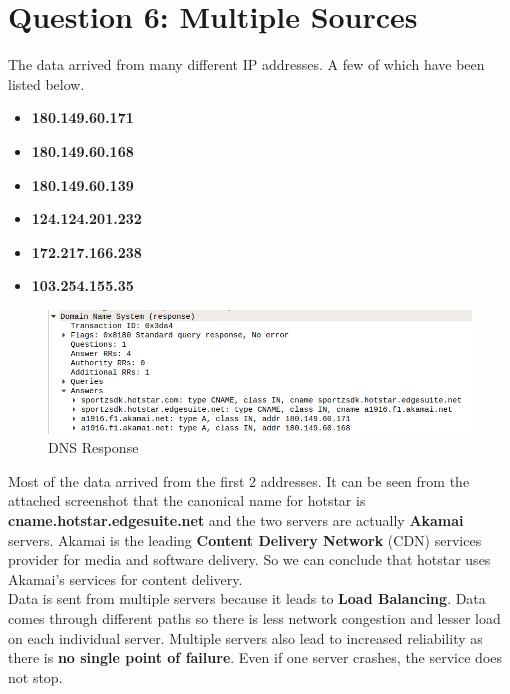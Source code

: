 \documentclass[a4paper,10pt]{article}
\newlength{\strutheight}
\begin{document}
\section*{Question 6: Multiple Sources}
The data arrived from many different IP addresses. A few of which have been listed below.
\begin{itemize}[{\color{Magenta}$\star$}]
	\item \textbf{180.149.60.171}
	\item \textbf{180.149.60.168}
	\item \textbf{180.149.60.139}
	\item \textbf{124.124.201.232}
	\item \textbf{172.217.166.238}
	\item \textbf{103.254.155.35}
\end{itemize}
\begin{adjustbox}{valign=T,raise=\strutheight,minipage={\linewidth}}
	\begin{figure}
		\includegraphics[width=12cm]{Images/DNS_response}
		\caption{DNS Response}
	\end{figure}
	\strut{}
	
	Most of the data arrived from the first 2 addresses. It can be seen from the attached screenshot that the canonical name for hotstar is \textbf{cname.hotstar.edgesuite.net} and the two servers are actually \textbf{Akamai} servers. Akamai is the leading \textbf{Content Delivery Network} (CDN) services provider for media and software delivery. So we can conclude that hotstar uses Akamai's services for content delivery. \\
	Data is sent from multiple servers because it leads to \textbf{Load Balancing}. Data comes through different paths so there is less network congestion and lesser load on each individual server. Multiple servers also lead to increased reliability as there is \textbf{no single point of failure}. Even if one server crashes, the service does not stop.
\end{adjustbox} 
\end{document}
